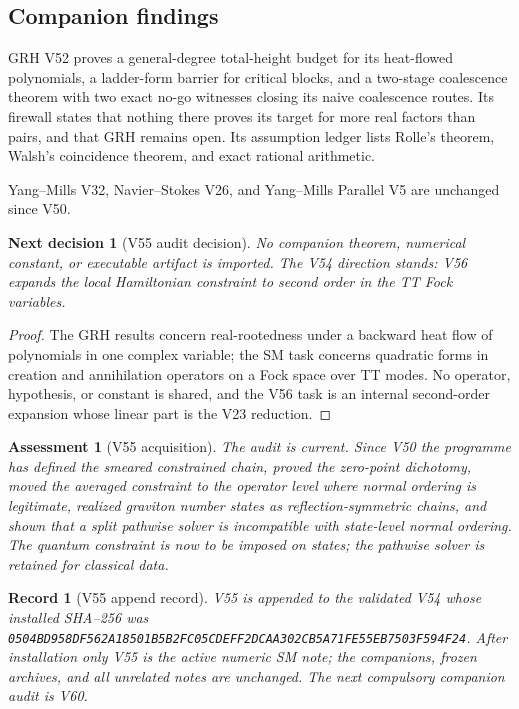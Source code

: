 \documentclass[11pt]{article}
\newtheorem{decision}[theorem]{Next decision}
\newtheorem{assessment}[theorem]{Assessment}
\newtheorem{record}[theorem]{Record}
\theoremstyle{remark}
\begin{document}
\subsection{Companion findings}

GRH V52 proves a general-degree total-height budget for its heat-flowed
polynomials, a ladder-form barrier for critical blocks, and a two-stage
coalescence theorem with two exact no-go witnesses closing its naive
coalescence routes.  Its firewall states that nothing there proves its
target for more real factors than pairs, and that GRH remains open.
Its assumption ledger lists Rolle's theorem, Walsh's coincidence
theorem, and exact rational arithmetic.

Yang--Mills V32, Navier--Stokes V26, and Yang--Mills Parallel V5 are
unchanged since V50.

\begin{decision}[V55 audit decision]
\label{dec:v19v55-audit}
No companion theorem, numerical constant, or executable artifact is
imported.  The V54 direction stands: V56 expands the local Hamiltonian
constraint to second order in the TT Fock variables.
\end{decision}

\begin{proof}
The GRH results concern real-rootedness under a backward heat flow of
polynomials in one complex variable; the SM task concerns quadratic
forms in creation and annihilation operators on a Fock space over TT
modes.  No operator, hypothesis, or constant is shared, and the V56
task is an internal second-order expansion whose linear part is the V23
reduction.
\end{proof}

\begin{assessment}[V55 acquisition]
\label{ass:v19v55}
The audit is current.  Since V50 the programme has defined the smeared
constrained chain, proved the zero-point dichotomy, moved the averaged
constraint to the operator level where normal ordering is legitimate,
realized graviton number states as reflection-symmetric chains, and
shown that a split pathwise solver is incompatible with state-level
normal ordering.  The quantum constraint is now to be imposed on
states; the pathwise solver is retained for classical data.
\end{assessment}

\begin{record}[V55 append record]
\label{rec:v19v55}
V55 is appended to the validated V54 whose installed SHA--256 was
\texttt{0504BD958DF562A18501B5B2FC05CDEFF2DCAA302CB5A71FE55EB7503F594F24}.
After installation only V55 is the active numeric SM note; the
companions, frozen archives, and all unrelated notes are unchanged.  The
next compulsory companion audit is V60.
\end{record}
\end{document}
